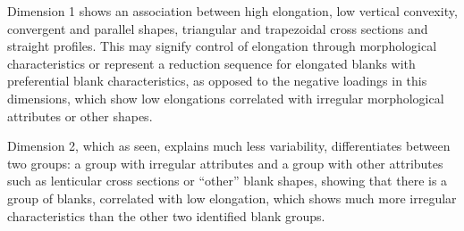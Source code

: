 \documentclass[12pt,twoside]{reedthesis}
\begin{document}
Dimension 1 shows an association between high elongation, low vertical convexity, convergent and parallel shapes, triangular and trapezoidal cross sections and straight profiles. This may signify control of elongation through morphological characteristics or represent a reduction sequence for elongated blanks with preferential blank characteristics, as opposed to the negative loadings in this dimensions, which show low elongations correlated with irregular morphological attributes or other shapes.

Dimension 2, which as seen, explains much less variability, differentiates between two groups: a group with irregular attributes and a group with other attributes such as lenticular cross sections or ``other'' blank shapes, showing that there is a group of blanks, correlated with low elongation, which shows much more irregular characteristics than the other two identified blank groups.
\end{document}
